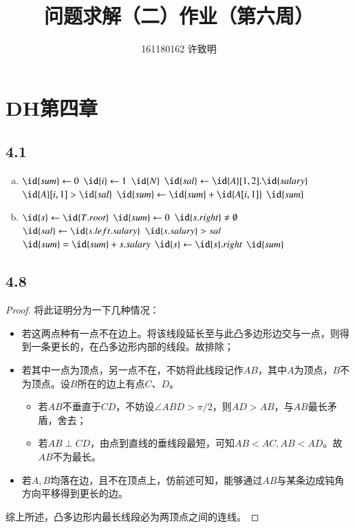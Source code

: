 \documentclass[twocolumn]{article}
\begin{document}
	\title{问题求解（二）作业（第六周）}\author{161180162 许致明}\maketitle
	\section*{DH第四章}
	\subsection*{4.1}
	\begin{enumerate}[(a)]
		\item 
		\begin{codebox}
			\zi {}\li 
			$\id{sum}\gets 0$\li 
			\For $\id{i}\gets 1$ \To $\id{N}$\Do\li
			$\id{sal}\gets \id{A}[1,2].\id{salary}$ \li 
			\If $\id{A}[i,1]>\id{sal}$\Do \li 
			$\id{sum}\gets \id{sum}+\id{A[i,1]}$ 
			\End\End\li 
			\Return $\id{sum}$
		\end{codebox}
		\item 
		\begin{codebox}
			\zi \proc{Sum-2$(\id{T})$}\li 
			$\id{s}\gets \id{T.root}$\li
			$\id{sum}\gets 0$\li  
			\While $\id{s.right}\neq \emptyset$\Do \li 
			$\id{sal}\gets \id{s.left.salary}$\li 
			\If $\id{s.salary}>sal$\Do \li 
			$\id{sum}=\id{sum}+s.salary$\End\li 
			$\id{s}\gets \id{s}.right$\End \li 
			\Return $\id{sum}$
		\end{codebox}
	\end{enumerate}
	\subsection*{4.8}
	\begin{proof}
		将此证明分为一下几种情况：
		\begin{itemize}
			\item 若这两点种有一点不在边上。将该线段延长至与此凸多边形边交与一点，则得到一条更长的，在凸多边形内部的线段。故排除；
			\item 若其中一点为顶点，另一点不在，不妨将此线段记作$AB$，其中$A$为顶点，$B$不为顶点。设$B$所在的边上有点$C$、$D$。
			\begin{itemize}
				\item 若$AB$不垂直于$CD$，不妨设$\angle ABD>\pi/2$，则$AD>AB$，与$AB$最长矛盾，舍去；
				\item 若$AB\perp CD$，由点到直线的垂线段最短，可知$AB<AC,AB<AD$。故$AB$不为最长。
			\end{itemize}
			\item 若$A,B$均落在边，且不在顶点上，仿前述可知，能够通过$AB$与某条边成钝角方向平移得到更长的边。
		\end{itemize}
		综上所述，凸多边形内最长线段必为两顶点之间的连线。
	\end{proof}
\end{document}
